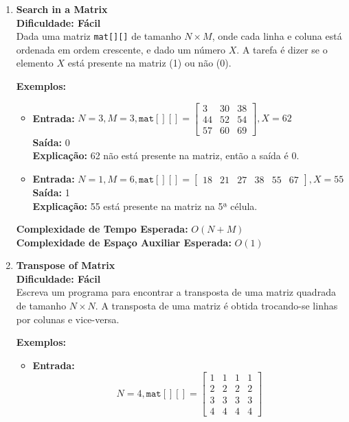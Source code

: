 \documentclass[a4paper,12pt]{article}
\begin{document}
\begin{enumerate}

    \item \textbf{Search in a Matrix} \\
    \textbf{Dificuldade: Fácil} \\
    Dada uma matriz \texttt{mat[][]} de tamanho \( N \times M \), onde cada linha e coluna está ordenada em ordem crescente, e dado um número \( X \). A tarefa é dizer se o elemento \( X \) está presente na matriz (1) ou não (0).
    
    \textbf{Exemplos:}
    \begin{itemize}
        \item \textbf{Entrada:} \( N = 3, M = 3, \texttt{mat}[][] = \begin{bmatrix}3 & 30 & 38\\44 & 52 & 54\\57 & 60 & 69\end{bmatrix}, X = 62 \) \\
        \textbf{Saída:} 0 \\
        \textbf{Explicação:} 62 não está presente na matriz, então a saída é 0.
        
        \item \textbf{Entrada:} \( N = 1, M = 6, \texttt{mat}[][] = \begin{bmatrix}18 & 21 & 27 & 38 & 55 & 67\end{bmatrix}, X = 55 \) \\
        \textbf{Saída:} 1 \\
        \textbf{Explicação:} 55 está presente na matriz na 5ª célula.
    \end{itemize}
    
    \textbf{Complexidade de Tempo Esperada:} \( O(N+M) \) \\
    \textbf{Complexidade de Espaço Auxiliar Esperada:} \( O(1) \)

    \item \textbf{Transpose of Matrix} \\
    \textbf{Dificuldade: Fácil} \\
    Escreva um programa para encontrar a transposta de uma matriz quadrada de tamanho \( N \times N \). A transposta de uma matriz é obtida trocando-se linhas por colunas e vice-versa.

    \textbf{Exemplos:}
    \begin{itemize}
        \item \textbf{Entrada:} \[ N = 4, \texttt{mat}[][] = 
        \begin{bmatrix}
            1 & 1 & 1 & 1\\
            2 & 2 & 2 & 2\\
            3 & 3 & 3 & 3\\
            4 & 4 & 4 & 4
        \end{bmatrix}\] 


\end{itemize}
\end{enumerate}
\end{document}

